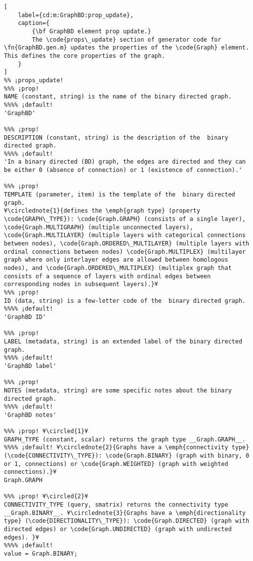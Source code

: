 \documentclass{tufte-handout}
\begin{document}
\begin{lstlisting}[
	label={cd:m:GraphBD:prop_update},
	caption={
		{\bf GraphBD element prop update.}
		The \code{props\_update} section of generator code for \fn{GraphBD.gen.m} updates the properties of the \code{Graph} element. This defines the core properties of the graph.
	}
]
%% ¡props_update!
%%% ¡prop!
NAME (constant, string) is the name of the binary directed graph.
%%%% ¡default!
'GraphBD'

%%% ¡prop!
DESCRIPTION (constant, string) is the description of the  binary directed graph.
%%%% ¡default!
'In a binary directed (BD) graph, the edges are directed and they can be either 0 (absence of connection) or 1 (existence of connection).'

%%% ¡prop!
TEMPLATE (parameter, item) is the template of the  binary directed graph.
¥\circlednote{1}{defines the \emph{graph type} (property \code{GRAPH\_TYPE}): \code{Graph.GRAPH} (consists of a single layer), \code{Graph.MULTIGRAPH} (multiple unconnected layers), \code{Graph.MULTILAYER} (multiple layers with categorical connections between nodes), \code{Graph.ORDERED\_MULTILAYER} (multiple layers with ordinal connections between nodes) \code{Graph.MULTIPLEX} (multilayer graph where only interlayer edges are allowed between homologous nodes), and \code{Graph.ORDERED\_MULTIPLEX} (multiplex graph that consists of a sequence of layers with ordinal edges between corresponding nodes in subsequent layers).}¥
%%% ¡prop!
ID (data, string) is a few-letter code of the  binary directed graph.
%%%% ¡default!
'GraphBD ID'

%%% ¡prop!
LABEL (metadata, string) is an extended label of the binary directed graph.
%%%% ¡default!
'GraphBD label'

%%% ¡prop!
NOTES (metadata, string) are some specific notes about the binary directed graph.
%%%% ¡default!
'GraphBD notes'

%%% ¡prop! ¥\circled{1}¥
GRAPH_TYPE (constant, scalar) returns the graph type __Graph.GRAPH__.
%%%% ¡default! ¥\circlednote{2}{Graphs have a \emph{connectivity type} (\code{CONNECTIVITY\_TYPE}): \code{Graph.BINARY} (graph with binary, 0 or 1, connections) or \code{Graph.WEIGHTED} (graph with weighted connections).}¥
Graph.GRAPH

%%% ¡prop! ¥\circled{2}¥
CONNECTIVITY_TYPE (query, smatrix) returns the connectivity type __Graph.BINARY__. ¥\circlednote{3}{Graphs have a \emph{directionality type} (\code{DIRECTIONALITY\_TYPE}): \code{Graph.DIRECTED} (graph with directed edges) or \code{Graph.UNDIRECTED} (graph with undirected edges). }¥
%%%% ¡default!
value = Graph.BINARY;


\end{lstlisting}
\end{document}
